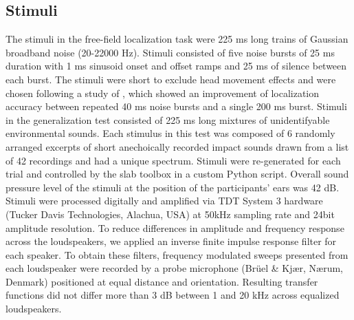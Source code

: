 \documentclass[preprint]{JASA}
\begin{document}
\subsection{Stimuli} \label{stimuli}
The stimuli in the free-field localization task were 225 ms long trains of Gaussian broadband noise (20-22000 Hz). Stimuli consisted of five noise bursts of 25 ms duration with 1 ms sinusoid onset and offset ramps and 25 ms of silence between each burst. The stimuli were short to exclude head movement effects and were chosen following a study of \citet{dramas_auditoryguided_2008}, which showed an improvement of localization accuracy between repeated 40 ms noise bursts and a single 200 ms burst. Stimuli in the generalization test consisted of 225 ms long mixtures of unidentifyable environmental sounds. Each stimulus in this test was composed of 6 randomly arranged excerpts of short anechoically recorded impact sounds \citep{nakamura_acoustical_2000} drawn from a list of 42 recordings and had a unique spectrum. Stimuli were re-generated for each trial and controlled by the slab toolbox \citep{schonwiesner_soundlab_2021} in a custom Python script. Overall sound pressure level of the stimuli at the position of the participants’ ears was 42 dB. Stimuli were processed digitally and amplified via TDT System 3 hardware (Tucker Davis Technologies, Alachua, USA) at 50kHz sampling rate and 24bit amplitude resolution. To reduce differences in amplitude and frequency response across the loudspeakers, we applied an inverse finite impulse response filter for each speaker. To obtain these filters, frequency modulated sweeps presented from each loudspeaker were recorded by a probe microphone (Brüel \& Kjær, Nærum, Denmark) positioned at equal distance and orientation. Resulting transfer functions did not differ more than 3 dB between 1 and 20 kHz across equalized loudspeakers.
\end{document}
